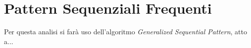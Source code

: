 \chapter{Pattern Sequenziali Frequenti}
\label{ch:seq}

Per questa analisi si farà uso dell'algoritmo \textit{Generalized Sequential Pattern}, atto a...